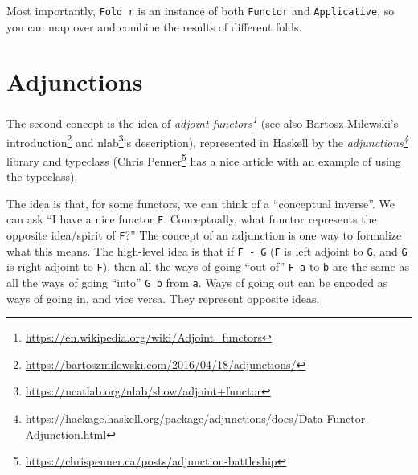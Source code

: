 \documentclass[]{article}
\newenvironment{Shaded}{}{}
\newcommand{\CommentTok}[1]{\textcolor[rgb]{0.38,0.63,0.69}{\textit{#1}}}
\newcommand{\DataTypeTok}[1]{\textcolor[rgb]{0.56,0.13,0.00}{#1}}
\newcommand{\DecValTok}[1]{\textcolor[rgb]{0.25,0.63,0.44}{#1}}
\newcommand{\FunctionTok}[1]{\textcolor[rgb]{0.02,0.16,0.49}{#1}}
\newcommand{\KeywordTok}[1]{\textcolor[rgb]{0.00,0.44,0.13}{\textbf{#1}}}
\newcommand{\NormalTok}[1]{#1}
\newcommand{\OperatorTok}[1]{\textcolor[rgb]{0.40,0.40,0.40}{#1}}
\newcommand{\OtherTok}[1]{\textcolor[rgb]{0.00,0.44,0.13}{#1}}
\renewcommand{\href}[2]{#2\footnote{\url{#1}}}
\begin{document}
\begin{Shaded}
\end{Shaded}

Most importantly, \texttt{Fold\ r} is an instance of both \texttt{Functor} and
\texttt{Applicative}, so you can map over and combine the results of different
folds.

\hypertarget{adjunctions}{%
\section{Adjunctions}\label{adjunctions}}

The second concept is the idea of
\emph{\href{https://en.wikipedia.org/wiki/Adjoint_functors}{adjoint functors}}
(see also \href{https://bartoszmilewski.com/2016/04/18/adjunctions/}{Bartosz
Milewski's introduction} and
\href{https://ncatlab.org/nlab/show/adjoint+functor}{nlab}'s description),
represented in Haskell by the
\emph{\href{https://hackage.haskell.org/package/adjunctions/docs/Data-Functor-Adjunction.html}{adjunctions}}
library and typeclass
(\href{https://chrispenner.ca/posts/adjunction-battleship}{Chris Penner} has a
nice article with an example of using the typeclass).

The idea is that, for some functors, we can think of a ``conceptual inverse''.
We can ask ``I have a nice functor \texttt{F}. Conceptually, what functor
represents the opposite idea/spirit of \texttt{F}?'' The concept of an
adjunction is one way to formalize what this means. The high-level idea is that
if \texttt{F\ -\textbar{}\ G} (\texttt{F} is left adjoint to \texttt{G}, and
\texttt{G} is right adjoint to \texttt{F}), then all the ways of going ``out
of'' \texttt{F\ a} to \texttt{b} are the same as all the ways of going ``into''
\texttt{G\ b} from \texttt{a}. Ways of going out can be encoded as ways of going
in, and vice versa. They represent opposite ideas.
\end{document}
